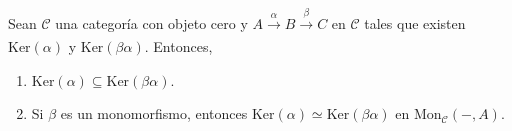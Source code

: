 \documentclass[tesis]{subfiles}
\begin{document}
\begin{Lema}\label{Mendoza-1.5.4}
    Sean $\mathscr{C}$ una categoría con objeto cero y $A\xrightarrow[]{\alpha}B\xrightarrow[]{\beta}C$ en $\mathscr{C}$ tales que existen $\text{Ker}(\alpha)$ y $\text{Ker}(\beta\alpha)$. Entonces,
    \begin{enumerate}[label=(\alph*)]
    
        \item $\text{Ker}(\alpha)\subseteq\text{Ker}(\beta\alpha)$.

        \item Si $\beta$ es un monomorfismo, entonces $\text{Ker}(\alpha)\simeq \text{Ker}(\beta\alpha)$ en $\text{Mon}_\mathscr{C}(-,A)$.
    \end{enumerate}
\end{Lema}
\end{document}
